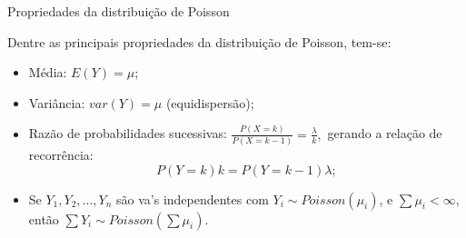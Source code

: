 \documentclass[10pt, aspectratio=169]{beamer}\usepackage[]{graphicx}\usepackage[]{color}
\begin{document}
\begin{frame}{Propriedades da distribuição de Poisson}

Dentre as principais propriedades da distribuição de Poisson, tem-se:
\vspace{0,3cm}
\begin{itemize}

    \item Média: $E(Y)= \mu$;
    \vspace{0,5cm}
    \item Variância: $var(Y)=\mu$ (equidispersão);
    \vspace{0,5cm}
    \item Razão de probabilidades sucessivas: 
    $\frac{P\left ( X=k \right )}{P\left ( X=k-1 \right )}=\frac{\lambda}{k},$ 
    gerando a relação de recorrência:
    $$
        P(Y=k)k=P(Y=k-1)\lambda;
    $$
    \item Se $Y_{1},Y_{2},...,Y_{n}$ são va's independentes com 
    $Y_{i}\sim Poisson(\mu_{i})$, e $\sum\mu_{i}<\infty$, então 
    $\sum Y_{i}\sim Poisson(\sum\mu_{i})$.
    \end{itemize}
\end{frame}

\end{document}
